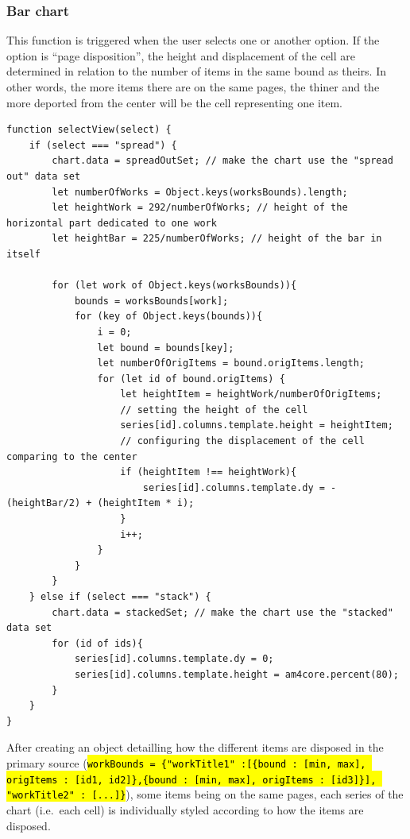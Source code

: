 \documentclass[a4paper,12pt,twoside]{book}
\let\OldTexttt\texttt
\renewcommand{\texttt}[1]{\OldTexttt{\hl{#1}}}
\begin{document}
				\subsubsection{Bar chart}\label{bar-chart}

This function is triggered when the user selects one or another option. If the option is ``page disposition'', the height and displacement of the cell are determined in relation to the number of items in the same bound as theirs. In other words, the more items there are on the same pages, the thiner and the more deported from the center will be the cell representing one item.
 
\begin{lstlisting}
function selectView(select) {
    if (select === "spread") {
        chart.data = spreadOutSet; // make the chart use the "spread out" data set
        let numberOfWorks = Object.keys(worksBounds).length;
        let heightWork = 292/numberOfWorks; // height of the horizontal part dedicated to one work
        let heightBar = 225/numberOfWorks; // height of the bar in itself

        for (let work of Object.keys(worksBounds)){
            bounds = worksBounds[work];
            for (key of Object.keys(bounds)){
                i = 0;
                let bound = bounds[key];
                let numberOfOrigItems = bound.origItems.length;
                for (let id of bound.origItems) {
                    let heightItem = heightWork/numberOfOrigItems;
                    // setting the height of the cell
                    series[id].columns.template.height = heightItem;
                    // configuring the displacement of the cell comparing to the center
                    if (heightItem !== heightWork){
                        series[id].columns.template.dy = -(heightBar/2) + (heightItem * i);
                    }
                    i++;
                }
            }
        }
    } else if (select === "stack") {
        chart.data = stackedSet; // make the chart use the "stacked" data set
        for (id of ids){
            series[id].columns.template.dy = 0;
            series[id].columns.template.height = am4core.percent(80);
        }
    }
}
\end{lstlisting}

After creating an object detailling how the different items are disposed in the primary source (\texttt{workBounds = \{"workTitle1" :[\{bound : [min, max], origItems : [id1, id2]\},\{bound : [min, max], origItems : [id3]\}], "workTitle2" : [...]\}}), some items being on the same pages, each series of the chart (i.e.~each cell) is individually styled according to how the items are disposed.
\end{document}

